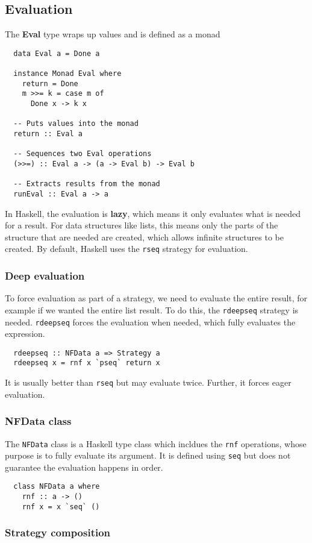 \documentclass[CS4204-Notes.tex]{subfiles}
\begin{document}
\subsection{Evaluation}
The \textbf{Eval} type wraps up values and is defined as a monad
\begin{lstlisting}
  data Eval a = Done a

  instance Monad Eval where
    return = Done
    m >>= k = case m of
      Done x -> k x

  -- Puts values into the monad
  return :: Eval a
  
  -- Sequences two Eval operations
  (>>=) :: Eval a -> (a -> Eval b) -> Eval b
  
  -- Extracts results from the monad
  runEval :: Eval a -> a
\end{lstlisting}
In Haskell, the evaluation is \textbf{lazy}, which means it only evaluates what is needed for a result. For data structures like lists, this means only the parts of the structure that are needed are created, which allows infinite structures to be created. By default, Haskell uses the \texttt{rseq} strategy for evaluation.

\subsubsection{Deep evaluation}
To force evaluation as part of a strategy, we need to evaluate the entire result, for example if we wanted the entire list result. To do this, the \texttt{rdeepseq} strategy is needed. \texttt{rdeepseq} forces the evaluation when needed, which fully evaluates the expression.
\begin{lstlisting}
  rdeepseq :: NFData a => Strategy a
  rdeepseq x = rnf x `pseq` return x
\end{lstlisting}
It is usually better than \texttt{rseq} but may evaluate twice. Further, it forces eager evaluation.

\subsubsection{NFData class}
The \texttt{NFData} class is a Haskell type class which incldues the \texttt{rnf} operations, whose purpose is to fully evaluate its argument. It is defined using \texttt{seq} but does not guarantee the evaluation happens in order.
\begin{lstlisting}
  class NFData a where
    rnf :: a -> ()
    rnf x = x `seq` ()
\end{lstlisting}

\subsubsection{Strategy composition}
\end{document}
